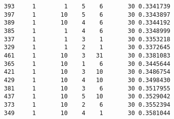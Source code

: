 
\begin{verbatim}
393     1        1    5    6       30 0.3341739
397     1       10    5    6       30 0.3343897
389     1       10    4    6       30 0.3344192
385     1        1    4    6       30 0.3348999
337     1        1    3    1       30 0.3353218
329     1        1    2    1       30 0.3372645
461     1       10    3   31       30 0.3381083
365     1       10    1    6       30 0.3445644
421     1       10    3   10       30 0.3486754
429     1       10    4   10       30 0.3498430
381     1       10    3    6       30 0.3517955
437     1       10    5   10       30 0.3529042
373     1       10    2    6       30 0.3552394
349     1       10    4    1       30 0.3581044
\end{verbatim}


